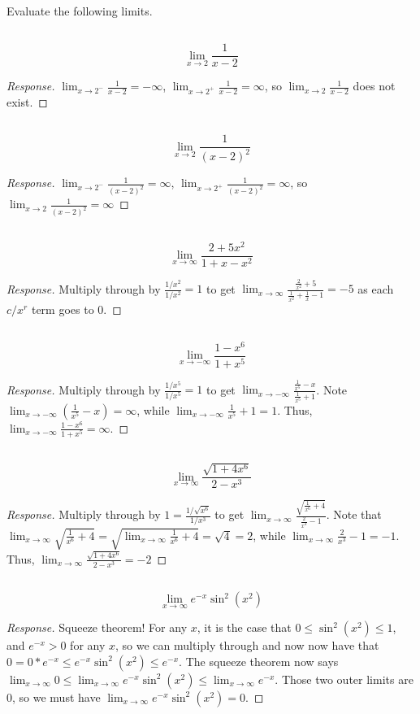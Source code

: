 \documentclass[english]{article}
\newcommand{\prob}[1]{\setcounter{section}{#1-1}\section{}}
\newcommand{\prt}[1]{\setcounter{subsection}{#1-1}\subsection{}}
\theoremstyle{remark}
\theoremstyle{definition}
\begin{document}
\prob{3} Evaluate the following limits.\begin{multicols}{2}


\prt{1} $$\lim_{x\to 2}\frac{1}{x-2}$$
\begin{proof}[Response]
	$\displaystyle\lim_{x\to 2^-}\frac{1}{x-2}=-\infty$, $\displaystyle\lim_{x\to 2^+}\frac{1}{x-2}=\infty$, so $\displaystyle\lim_{x\to 2}\frac{1}{x-2}$ does not exist.
\end{proof}

\prt{2} $$\lim_{x\to 2}\frac{1}{(x-2)^2}$$
\begin{proof}[Response]
		$\displaystyle\lim_{x\to 2^-}\frac{1}{(x-2)^2}=\infty$, $\displaystyle\lim_{x\to 2^+}\frac{1}{(x-2)^2}=\infty$, so $\displaystyle\lim_{x\to 2}\frac{1}{(x-2)^2}=\infty$
\end{proof}
\prt{3}
$$\lim_{x\to \infty}\frac{2+5x^2}{1+x-x^2}$$
\begin{proof}[Response]
	Multiply through by $\displaystyle\frac{1/x^2}{1/x^2}=1$ to get $\displaystyle\lim_{x\to \infty}\frac{\frac{2}{x^2}+5}{\frac{1}{x^2}+\frac{1}{x}-1}=-5$ as each $c/x^r$ term goes to $0$. 
\end{proof} \columnbreak
\prt{4}
$$\lim_{x\to -\infty} \frac{1-x^6}{1+x^5}$$\begin{proof}[Response]
	Multiply through by $\displaystyle\frac{1/x^5}{1/x^5}=1$ to get $\displaystyle\lim_{x\to -\infty}\frac{\frac{1}{x^5}-x}{\frac{1}{x^5}+1}$. Note $\displaystyle\lim_{x\to -\infty}(\frac{1}{x^5}-x)=\infty$, while $\displaystyle\lim_{x\to -\infty}\frac{1}{x^5}+1=1$. Thus, $\displaystyle\lim_{x\to -\infty}\frac{1-x^6}{1+x^5}=\infty$. 
\end{proof}
\prt{5}
$$\lim_{x\to \infty}\frac{\sqrt{1+4x^6}}{2-x^3}$$\begin{proof}[Response]
	Multiply through by $1=\frac{1/\sqrt{x^6}}{1/x^3}$ to get $\displaystyle\lim_{x\to \infty} \frac{\sqrt{\frac{1}{x^6}+4}}{\frac{2}{x^3}-1}$. Note that $\displaystyle\lim_{x\to \infty}\sqrt{\frac{1}{x^6}+4}=\sqrt{\lim_{x\to \infty}\frac{1}{x^6}+4}=\sqrt{4}=2$, while $\displaystyle\lim_{x\to \infty}\frac{2}{x^3}-1=-1$. Thus, $\displaystyle\lim_{x\to \infty}\frac{\sqrt{1+4x^6}}{2-x^3}=-2$
\end{proof}
\prt{6} $$\lim_{x\to \infty} e^{-x}\sin^2(x^2)$$\begin{proof}[Response]
	Squeeze theorem! For any $x$, it is the case that $0\leq \sin^2(x^2)\leq 1$, and $e^{-x}>0$ for any $x$, so we can multiply through and now now have that $0=0*e^{-x}\leq e^{-x}\sin^2(x^2)\leq e^{-x}$. The squeeze theorem now says $\displaystyle\lim_{x\to\infty}0\leq\lim_{x\to\infty} e^{-x}\sin^2(x^2)\leq\lim_{x\to\infty} e^{-x}$. Those two outer limits are $0$, so we must have $\displaystyle\lim_{x\to \infty}e^{-x}\sin^2(x^2)=0$. 
\end{proof}
\end{multicols}
\end{document}
